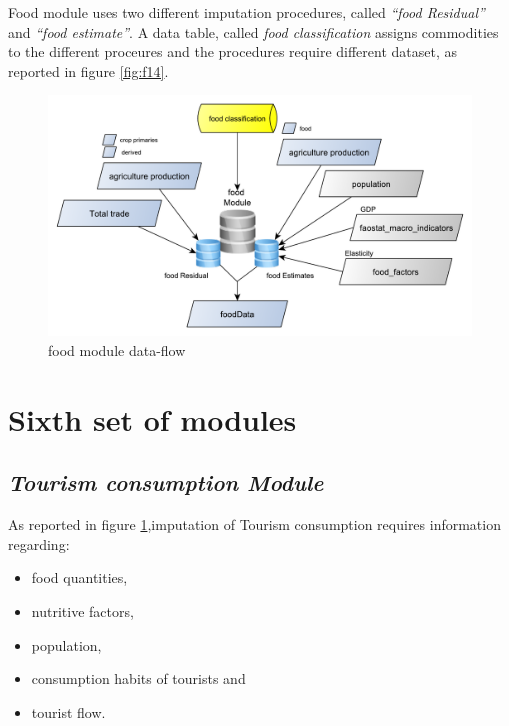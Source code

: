 \documentclass[]{article}
\providecommand{\tightlist}{%
  \setlength{\itemsep}{0pt}\setlength{\parskip}{0pt}}
\begin{document}
Food module uses two different imputation procedures, called
\emph{``food Residual''} and \emph{``food estimate''}. A data table,
called \emph{food classification} assigns commodities to the different
proceures and the procedures require different dataset, as reported in
figure \ref{fig:f14}.

\begin{figure}[H]

{\centering \includegraphics[width=0.8\linewidth]{images/SwsFbs/15_food} 

}

\caption{\label{fig:f15}food module data-flow}\label{fig:f15}
\end{figure}

\section{Sixth set of modules}\label{sixth-set-of-modules}

\subsection{\texorpdfstring{\emph{Tourism consumption
Module}}{Tourism consumption Module}}\label{tourism-consumption-module}

As reported in figure \ref{fig:f15},imputation of Tourism consumption
requires information regarding:

\begin{itemize}
\tightlist
\item
  food quantities,
\item
  nutritive factors,
\item
  population,
\item
  consumption habits of tourists and
\item
  tourist flow.
\end{itemize}
\end{document}
